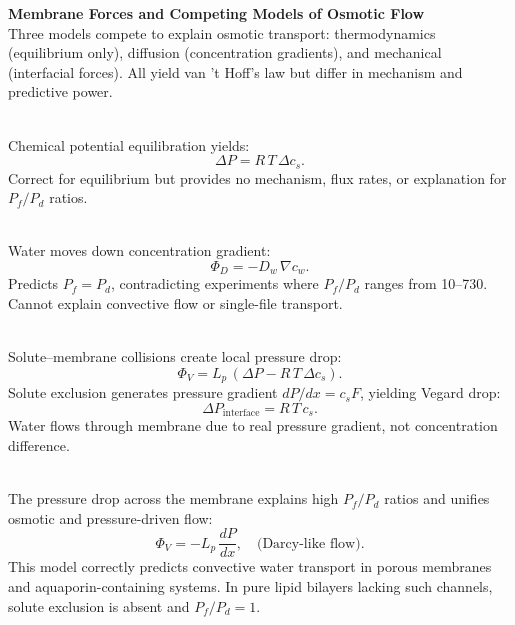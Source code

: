 \begin{technical}
{\Large\textbf{Membrane Forces and Competing Models of Osmotic Flow}}\\[0.3em]

Three models compete to explain osmotic transport: thermodynamics (equilibrium only), diffusion (concentration gradients), and mechanical (interfacial forces). All yield van 't Hoff's law but differ in mechanism and predictive power.

\\[0.5em]
Chemical potential equilibration yields:
\begin{equation*}
\Delta P = R\,T\,\Delta c_s.
\end{equation*}
Correct for equilibrium but provides no mechanism, flux rates, or explanation for $P_f / P_d$ ratios.

\\[0.5em]
Water moves down concentration gradient:
\begin{equation*}
\Phi_D = -D_w \,\nabla c_w.
\end{equation*}
Predicts $P_f = P_d$, contradicting experiments where $P_f/P_d$ ranges from 10–730. Cannot explain convective flow or single-file transport.

\\[0.5em]
Solute–membrane collisions create local pressure drop:
\begin{equation*}
\Phi_V = L_p\,(\Delta P - R\,T\,\Delta c_s).
\end{equation*}
Solute exclusion generates pressure gradient $dP/dx = c_s F$, yielding Vegard drop:
\begin{equation*}
\Delta P_\text{interface} = R\,T\,c_s.
\end{equation*}
Water flows through membrane due to real pressure gradient, not concentration difference.

\\[0.5em]
The pressure drop across the membrane explains high $P_f / P_d$ ratios and unifies osmotic and pressure-driven flow:
\begin{equation*}
\Phi_V = -L_p\,\frac{dP}{dx}, \quad \text{(Darcy-like flow)}.
\end{equation*}
This model correctly predicts convective water transport in porous membranes and aquaporin-containing systems. In pure lipid bilayers lacking such channels, solute exclusion is absent and $P_f / P_d = 1$.


\end{technical}
